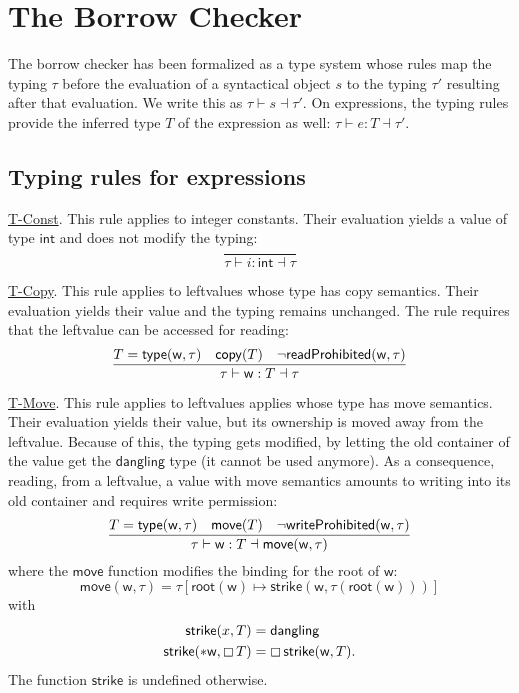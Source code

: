 \section{The Borrow Checker}\label{sec:borrow_checker}

The borrow checker has been formalized as a type system whose rules
map the typing $\tau$ before the evaluation of a syntactical object $s$ to
the typing $\tau'$ resulting after that evaluation.
We write this as $\tau\vdash s\dashv\tau'$.
On expressions, the typing
rules provide the inferred type $T$ of the expression as well:
$\tau\vdash e:T\dashv\tau'$.

\subsection{Typing rules for expressions}

\underline{\textsf{T-Const}}.
This rule applies to integer constants. Their evaluation
yields a value of type $\mathsf{int}$ and does not modify the typing:
\[
\frac
    {}
    {\tau\vdash i:\mathsf{int}\dashv\tau}
\]

\noindent
\underline{\textsf{T-Copy}}.
This rule applies to leftvalues whose type
has copy semantics. Their evaluation yields their value
and the typing remains unchanged. The rule requires that the leftvalue
can be accessed for reading:
\[
\frac
    {T=\mathsf{type}(\mathsf{w},\tau)\quad\mathsf{copy}(T)\quad\neg\mathsf{readProhibited}(\mathsf{w},\tau)}
    {\tau\vdash\mathsf{w}:T\dashv\tau}
\]

\noindent
\underline{\textsf{T-Move}}.
This rule applies to leftvalues applies whose type
has move semantics. Their evaluation yields their value,
but its ownership is moved away from the leftvalue. Because of this,
the typing gets modified, by letting the old container of the value
get the $\mathsf{dangling}$ type (it cannot be used anymore).
As a consequence, reading, from a leftvalue, a value with move semantics
amounts to writing into its old container and requires write permission:
\[
\frac
    {T=\mathsf{type}(\mathsf{w},\tau)\quad\mathsf{move}(T)\quad\neg\mathsf{writeProhibited}(\mathsf{w},\tau)}
    {\tau\vdash\mathsf{w}:T\dashv\mathsf{move}(\mathsf{w},\tau)}
\]
where the $\mathsf{move}$ function
modifies the binding for the root of $\mathsf{w}$:
\[
\mathsf{move}(\mathsf{w},\tau)=\tau[\mathsf{root}(\mathsf{w})\mapsto
  \mathsf{strike}(\mathsf{w},\tau(\mathsf{root}(\mathsf{w})))]
\]
with
\begin{align*}
  \mathsf{strike}(x,T)&=\mathsf{dangling}\\
  \mathsf{strike}(\mathtt{*}\mathsf{w},\boxempty\,{T})&=
  \boxempty\,{\mathsf{strike}(\mathsf{w},T)}.
\end{align*}
The function $\mathsf{strike}$ is undefined otherwise.

